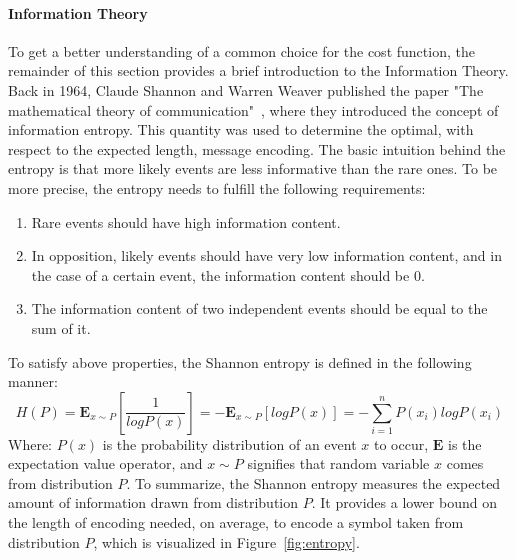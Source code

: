 \paragraph{Information Theory} \mbox{}
 
To get a better understanding of a common choice for the cost function, the remainder of this section provides a brief introduction to the Information Theory.
Back in 1964, Claude Shannon and Warren Weaver published the paper "The mathematical theory of communication"~\cite{Shannon}, where they introduced the concept of information entropy. This quantity was used to determine the optimal, with respect to the expected length,  message encoding. The basic intuition behind the entropy is that more likely events are less informative than the rare ones. To be more precise, the entropy needs to fulfill the following requirements:
\begin{enumerate}
\item Rare events should have high information content. 
\item In opposition, likely events should have very low information content, and in the case of a certain event, the information content should be $0$. 
\item The information content of two independent events should be equal to the sum of it. 
\end{enumerate}
To satisfy above properties, the Shannon entropy is defined in the following manner:  
\begin{equation}\label{eq:entropy}
H(P) =\mathbf{E}_{x\sim P}\left[\frac{1}{log P(x)} \right] = - \mathbf{E}_{x\sim P}[log P(x)] = - \sum_{i=1}^{n} P(x_i)log P(x_i)
\end{equation}
Where: $P(x)$ is the probability distribution of an event $x$ to occur, $\mathbf{E}$ is the expectation value operator, and $x \sim P$ signifies that random variable $x$ comes from distribution $P$. To summarize, the Shannon entropy measures the expected amount of information drawn from distribution $P$. It provides a lower bound on the length of encoding needed, on average, to encode a symbol taken from distribution $P$, which is visualized in Figure~\ref{fig:entropy}.

